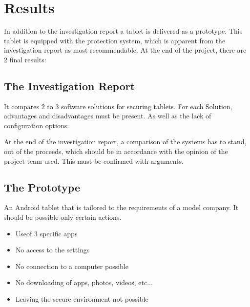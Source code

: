 \section*{Results}
In addition to the investigation report a tablet is delivered as a prototype. This tablet is equipped with the protection system, which is apparent from the investigation report as most recommendable.
\newline At the end of the project, there are 2 final results:
\subsection*{The Investigation Report}
It compares 2 to 3 software solutions for securing tablets. For each Solution, advantages and disadvantages must be present. As well as the lack of configuration options.

At the end of the investigation report, a comparison of the systems has to stand, out of the proceeds, which should be in accordance with the opinion of the project team used. This must be confirmed with arguments.
\subsection*{The Prototype}
An Android tablet that is tailored to the requirements of a model company. It should be possible only certain actions.
\begin{itemize}
	\item Useof 3 specific apps
	\item No access to the settings
	\item No connection to a computer possible
	\item No downloading of apps, photos, videos, etc...
	\item Leaving the secure environment not possible
\end{itemize}
